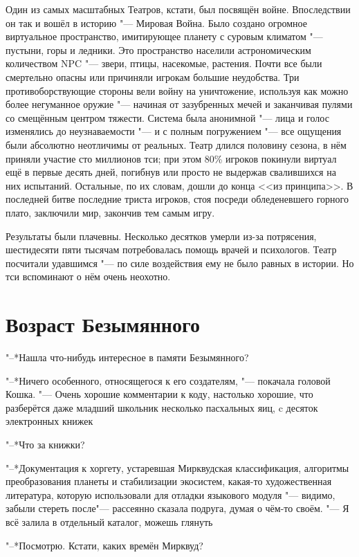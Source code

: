 \documentclass[a4paper,10pt,fleqn]{book}
\newcommand{\ldotst}{\so{...}\xspace}
\begin{document}
Один из самых масштабных Театров, кстати, был посвящён войне.
Впоследствии он так и вошёл в историю "--- Мировая Война.
Было создано огромное виртуальное пространство, имитирующее планету с суровым климатом "--- пустыни, горы и ледники.
Это пространство населили астрономическим количеством NPC "--- звери, птицы, насекомые, растения.
Почти все были смертельно опасны или причиняли игрокам большие неудобства.
Три противоборствующие стороны вели войну на уничтожение, используя как можно более негуманное оружие "--- начиная от зазубренных мечей и заканчивая пулями со смещённым центром тяжести.
Система была анонимной "--- лица и голос изменялись до неузнаваемости "--- и с полным погружением "--- все ощущения были абсолютно неотличимы от реальных.
Театр длился половину сезона, в нём приняли участие сто миллионов тси;
при этом 80\% игроков покинули виртуал ещё в первые десять дней, погибнув или просто не выдержав свалившихся на них испытаний.
Остальные, по их словам, дошли до конца <<из принципа>>.
В последней битве последние триста игроков, стоя посреди обледеневшего горного плато, заключили мир, закончив тем самым игру.

Результаты были плачевны.
Несколько десятков умерли из-за потрясения, шестидесяти пяти тысячам потребовалась помощь врачей и психологов.
Театр посчитали удавшимся "--- по силе воздействия ему не было равных в истории.
Но тси вспоминают о нём очень неохотно.

\section{Возраст Безымянного}

"--*Нашла что-нибудь интересное в памяти Безымянного?

"--*Ничего особенного, относящегося к его создателям, "--- покачала головой Кошка.
"--- Очень хорошие комментарии к коду, настолько хорошие, что разберётся даже младший школьник\ldotst несколько пасхальных яиц, c десяток электронных книжек\ldotst

"--*Что за книжки?

"--*Документация к хоргету, устаревшая Мирквудская классификация, алгоритмы преобразования планеты и стабилизации экосистем, какая-то художественная литература, которую использовали для отладки языкового модуля "--- видимо, забыли стереть после\ldotst "--- рассеянно сказала подруга, думая о чём-то своём.
"--- Я всё залила в отдельный каталог, можешь глянуть\ldotst

"--*Посмотрю.
Кстати, каких времён Мирквуд?
\end{document}
